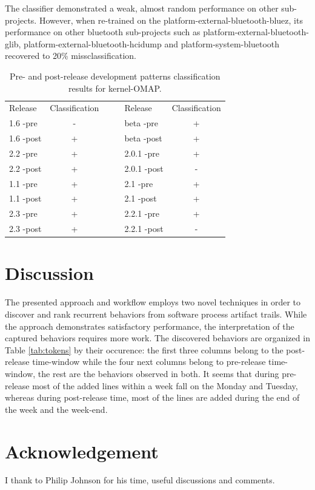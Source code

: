 \documentclass[10pt, conference, compsocconf]{IEEEtran}
\begin{document}
The classifier demonstrated a weak, almost random performance on other sub-projects. 
However, when re-trained on the platform-external-bluetooth-bluez, its performance on other bluetooth
sub-projects such as platform-external-bluetooth-glib, platform-external-bluetooth-hcidump and
platform-system-bluetooth recovered to 20\% missclassification.

\begin{table}
  \caption{Pre- and post-release development patterns classification results for kernel-OMAP.}
  \label{tab:success}
  \begin{tabular}{ | l | c | c c | l | c |}
  \cline{1-2} \cline{5-6}
  Release & Classification& & & Release & Classification\\
  \cline{1-2} \cline{5-6}
1.6 -pre & - & & & beta -pre & + \\
1.6 -post & + & & & beta -post & + \\
2.2 -pre & + & & & 2.0.1 -pre & + \\
2.2 -post & + & & & 2.0.1 -post & -\\
1.1 -pre & + & & & 2.1 -pre & + \\
1.1 -post & + & & & 2.1 -post & + \\
2.3 -pre & + & & & 2.2.1 -pre & + \\
2.3 -post & + & & & 2.2.1 -post & - \\ 
  \cline{1-2} \cline{5-6}
  \end{tabular}
\end{table}

\section{Discussion}
The presented approach and workflow employs two novel techniques in order to discover and 
rank recurrent behaviors from software process artifact trails. While the approach 
demonstrates satisfactory performance, the interpretation of the captured behaviors requires
more work. The discovered behaviors are organized in Table \ref{tab:tokens} by their 
occurence: the first three columns belong to the post-release time-window while
the four next columns belong to pre-release time-window, the rest are the behaviors observed 
in both. It seems that during pre-release most of the added lines within a week fall on the 
Monday and Tuesday, whereas during post-release time, most of the lines are added during the 
end of the week and the week-end.

\section{Acknowledgement}
I thank to Philip Johnson for his time, useful discussions and comments.
\end{document}
